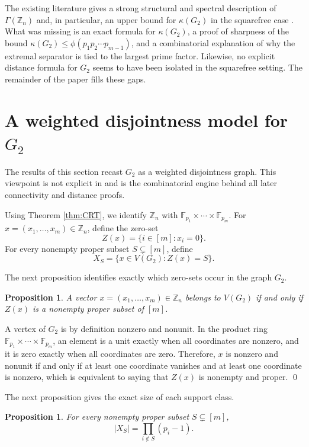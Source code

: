 \documentclass[12pt]{article}
\renewenvironment{proof}{{\bf \noindent Proof.}}{\qed}
\newtheorem{proposition}[theorem]{Proposition}
\theoremstyle{definition}
\newcommand{\F}{\mathbb F}
\begin{document}
	 The existing literature  gives a strong structural and spectral description of $\Gamma(\mathbb Z_n)$ and, in particular, an upper bound for $\kappa(G_2)$ in the squarefree case \cite{Banerjee2022}. What was missing is an exact formula for $\kappa(G_2)$, a proof of sharpness of the bound $\kappa(G_2)\leq \phi(p_1p_2\cdots p_{m-1})$, and a combinatorial explanation of why the extremal separator is tied to the largest prime factor. Likewise, no explicit distance formula for $G_2$ seems to have been isolated in the squarefree setting. The remainder of the paper fills these gaps.
	
	\section{A weighted disjointness model for $G_2$}\label{sec:model}
	 The results of this section recast $G_2$ as a weighted disjointness graph. This viewpoint is not explicit in \cite{Banerjee2022} and is the combinatorial engine behind all later connectivity and distance proofs.
	
	Using Theorem \ref{thm:CRT}, we identify $\mathbb Z_n$ with $\F_{p_1}\times\cdots\times\F_{p_m}$.
	 For $x=(x_1,\dots,x_m)\in \mathbb Z_n$, define the zero-set
		$$
		Z(x)=\{i\in [m]: x_i=0\}.
		$$
		For every nonempty proper subset $S\subsetneq [m]$, define
		$$
		X_S=\{x\in V(G_2): Z(x)=S\}.
		$$ 
	
	\medskip
	 The next proposition identifies exactly which zero-sets occur in the graph $G_2$.
	\begin{proposition}\label{prop:nonemptyproper}
		A vector $x=(x_1,\dots,x_m)\in \mathbb Z_n$ belongs to $V(G_2)$ if and only if $Z(x)$ is a nonempty proper subset of $[m]$.
	\end{proposition}
	
	\begin{proof}
		A vertex of $G_2$ is by definition nonzero and nonunit. In the product ring $\F_{p_1}\times\cdots\times\F_{p_m}$, an element is a unit exactly when all coordinates are nonzero, and it is zero exactly when all coordinates are zero. Therefore, $x$ is nonzero and nonunit if and only if at least one coordinate vanishes and at least one coordinate is nonzero, which is equivalent to saying that $Z(x)$ is nonempty and proper.
	\end{proof}
	
	\medskip
	 The next proposition gives the exact size of each support class. 
	\begin{proposition}\label{prop:classsize}
		For every nonempty proper subset $S\subsetneq [m]$,
		$$
		|X_S|=\prod_{i\notin S}(p_i-1).
		$$
	\end{proposition}
	
\end{document}
